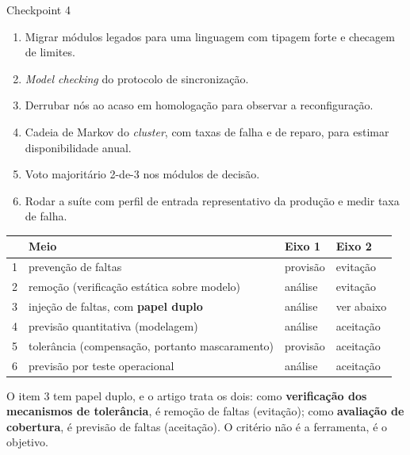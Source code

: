 \documentclass{beamer}
\begin{document}
\begin{frame}{Checkpoint 4}
    \footnotesize
    \begin{checkpoint}
        \scriptsize
        \begin{enumerate}
            \item Migrar m\'odulos legados para uma linguagem com tipagem forte e checagem de limites.
            \item \textit{Model checking} do protocolo de sincroniza\c{c}\~ao.
            \item Derrubar n\'os ao acaso em homologa\c{c}\~ao para observar a reconfigura\c{c}\~ao.
            \item Cadeia de Markov do \textit{cluster}, com taxas de falha e de reparo, para estimar disponibilidade anual.
            \item Voto majorit\'ario 2-de-3 nos m\'odulos de decis\~ao.
            \item Rodar a su\'ite com perfil de entrada representativo da produ\c{c}\~ao e medir taxa de falha.
        \end{enumerate}
    \end{checkpoint}
    \pause
    \smallskip
    \scriptsize
    \begin{tabularx}{\linewidth}{@{}c p{4.6cm} p{1.8cm} >{\raggedright\arraybackslash}X@{}}
        \toprule
        & \textbf{Meio} & \textbf{Eixo 1} & \textbf{Eixo 2} \\
        \midrule
        1 & preven\c{c}\~ao de faltas & provis\~ao & evita\c{c}\~ao \\
        2 & remo\c{c}\~ao (verifica\c{c}\~ao est\'atica sobre modelo) & an\'alise & evita\c{c}\~ao \\
        3 & inje\c{c}\~ao de faltas, com \textbf{papel duplo} & an\'alise & ver abaixo \\
        4 & previs\~ao quantitativa (modelagem) & an\'alise & aceita\c{c}\~ao \\
        5 & toler\^ancia (compensa\c{c}\~ao, portanto mascaramento) & provis\~ao & aceita\c{c}\~ao \\
        6 & previs\~ao por teste operacional & an\'alise & aceita\c{c}\~ao \\
        \bottomrule
    \end{tabularx}
    \smallskip
    \begin{ancora}
        \scriptsize
        O item 3 tem papel duplo, e o artigo trata os dois: como \textbf{verifica\c{c}\~ao dos mecanismos de toler\^ancia}, \'e remo\c{c}\~ao de faltas (evita\c{c}\~ao); como \textbf{avalia\c{c}\~ao de cobertura}, \'e previs\~ao de faltas (aceita\c{c}\~ao). O crit\'erio n\~ao \'e a ferramenta, \'e o objetivo.
    \end{ancora}
\end{frame}
\end{document}
